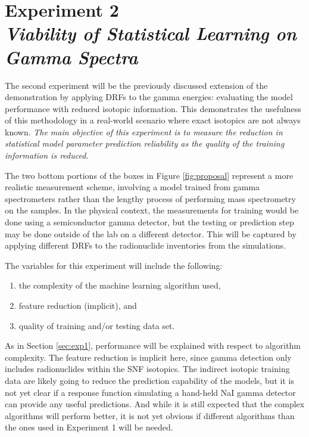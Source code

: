 \section[Experiment 2: Gamma Spectra]{Experiment 2\\ 
\large{\textit{Viability of Statistical Learning on Gamma Spectra}}}
\label{sec:exp2}

The second experiment will be the previously discussed extension of the
demonstration by applying \glspl{DRF} to the gamma energies: evaluating the
model performance with reduced isotopic information.  This demonstrates the
usefulness of this methodology in a real-world scenario where exact isotopics
are not always known.   \textit{The main objective of this experiment is to
measure the reduction in statistical model parameter prediction reliability as
the quality of the training information is reduced.}

The two bottom portions of the boxes in Figure \ref{fig:proposal} represent a
more realistic measurement scheme, involving a model trained from gamma
spectrometers rather than the lengthy process of performing mass spectrometry
on the samples.  In the physical context, the measurements for training would
be done using a semiconductor gamma detector, but the testing or prediction
step may be done outside of the lab on a different detector.  This will be
captured by applying different \glspl{DRF} to the radionuclide
inventories from the simulations.

The variables for this experiment will include the following:
\begin{enumerate}
  \itemsep-0.75em
  \item the complexity of the machine learning algorithm used, 
  \item feature reduction (implicit), and 
  \item quality of training and/or testing data set.
\end{enumerate}
As in Section \ref{sec:exp1}, performance will be explained with respect to
algorithm complexity.  The feature reduction is implicit here, since gamma
detection only includes radionuclides within the \gls{SNF} isotopics. The
indirect isotopic training data are likely going to reduce the prediction
capability of the models, but it is not yet clear if a response function
simulating a hand-held NaI gamma detector can provide any useful predictions.
And while it is still expected that the complex algorithms will perform better,
it is not yet obvious if different algorithms than the ones used in Experiment
1 will be needed. 

